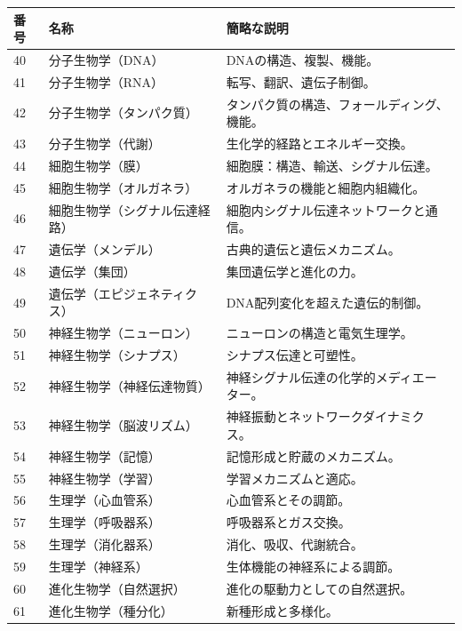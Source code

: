 \documentclass[13pt,a4paper]{ltjsarticle}
\begin{document}
	\begin{longtable}{|p{0.9cm}|p{6.0cm}|p{8.6cm}|}
		\hline
		\textbf{番号} & \textbf{名称} & \textbf{簡略な説明} \\
		\hline
		\endhead
		40 & 分子生物学（DNA） & DNAの構造、複製、機能。 \\
		\hline
		41 & 分子生物学（RNA） & 転写、翻訳、遺伝子制御。 \\
		\hline
		42 & 分子生物学（タンパク質） & タンパク質の構造、フォールディング、機能。 \\
		\hline
		43 & 分子生物学（代謝） & 生化学的経路とエネルギー交換。 \\
		\hline
		44 & 細胞生物学（膜） & 細胞膜：構造、輸送、シグナル伝達。 \\
		\hline
		45 & 細胞生物学（オルガネラ） & オルガネラの機能と細胞内組織化。 \\
		\hline
		46 & 細胞生物学（シグナル伝達経路） & 細胞内シグナル伝達ネットワークと通信。 \\
		\hline
		47 & 遺伝学（メンデル） & 古典的遺伝と遺伝メカニズム。 \\
		\hline
		48 & 遺伝学（集団） & 集団遺伝学と進化の力。 \\
		\hline
		49 & 遺伝学（エピジェネティクス） & DNA配列変化を超えた遺伝的制御。 \\
		\hline
		50 & 神経生物学（ニューロン） & ニューロンの構造と電気生理学。 \\
		\hline
		51 & 神経生物学（シナプス） & シナプス伝達と可塑性。 \\
		\hline
		52 & 神経生物学（神経伝達物質） & 神経シグナル伝達の化学的メディエーター。 \\
		\hline
		53 & 神経生物学（脳波リズム） & 神経振動とネットワークダイナミクス。 \\
		\hline
		54 & 神経生物学（記憶） & 記憶形成と貯蔵のメカニズム。 \\
		\hline
		55 & 神経生物学（学習） & 学習メカニズムと適応。 \\
		\hline
		56 & 生理学（心血管系） & 心血管系とその調節。 \\
		\hline
		57 & 生理学（呼吸器系） & 呼吸器系とガス交換。 \\
		\hline
		58 & 生理学（消化器系） & 消化、吸収、代謝統合。 \\
		\hline
		59 & 生理学（神経系） & 生体機能の神経系による調節。 \\
		\hline
		60 & 進化生物学（自然選択） & 進化の駆動力としての自然選択。 \\
		\hline
		61 & 進化生物学（種分化） & 新種形成と多様化。 \\

\end{longtable}
\end{document}
